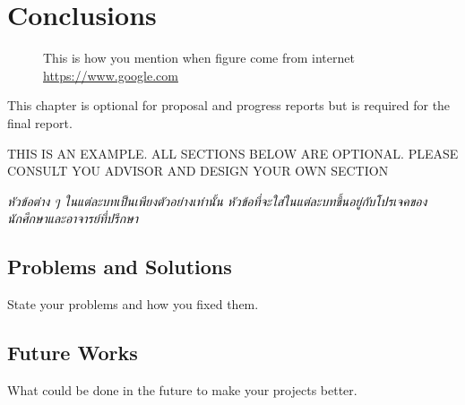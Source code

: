 \chapter{Conclusions}

 \begin{figure}[!h]
\caption{This is how you mention when figure come from internet  \href{https://www.google.com} {https://www.google.com}}\label{fig:x1}
\end{figure}

This chapter is optional for proposal and progress reports but 
is required for the final report.

THIS IS AN EXAMPLE. ALL SECTIONS BELOW ARE OPTIONAL. PLEASE CONSULT YOU ADVISOR AND DESIGN YOUR OWN SECTION

\emph{\textthai{หัวข้อต่าง ๆ ในแต่ละบทเป็นเพียงตัวอย่างเท่านั้น หัวข้อที่จะใส่ในแต่ละบทขึ้นอยู่กับโปรเจคของนักศึกษาและอาจารย์ที่ปรึกษา}}

\section{Problems and Solutions}
State your problems and how you fixed them.

\pagebreak
\section{Future Works}
What could be done in the future to make your projects better.

\pagebreak